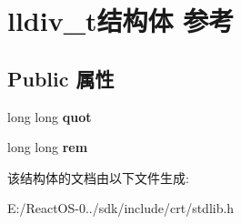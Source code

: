 \hypertarget{structlldiv__t}{}\section{lldiv\+\_\+t结构体 参考}
\label{structlldiv__t}
\subsection*{Public 属性}
\begin{DoxyCompactItemize}
\item 
\mbox{\label{structlldiv__t_ae4d4bccdf22f41e052073f5790c5ec37}} 
long long {\bfseries quot}
\item 
\mbox{\label{structlldiv__t_a32d4596a917aa9b496c8a49178a0e3c6}} 
long long {\bfseries rem}
\end{DoxyCompactItemize}


该结构体的文档由以下文件生成\+:\begin{DoxyCompactItemize}
\item 
E\+:/\+React\+O\+S-\/0../sdk/include/crt/stdlib.\+h\end{DoxyCompactItemize}
